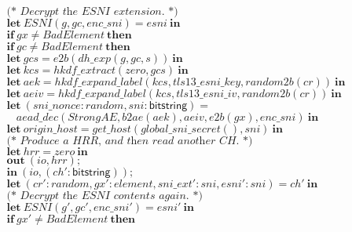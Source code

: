 \documentclass{article}
\newcommand{\kwl}[1]{\mathbf{#1}}
\newcommand{\kwt}[1]{\mathsf{#1}}
\newcommand{\var}[1]{\mathit{#1}}
\theoremstyle{definition}
\begin{document}
\begin{tabbing}
$ $\\
$\ \ \ \ \ \textit{(* Decrypt the ESNI extension. *)} $\\
$\ \ \ \ \ \kwl{let}\ \var{ESNI}(\var{g}, \var{gc}, \var{enc{\_}sni}) = \var{esni}\ \kwl{in} $\\
$\ \ \ \ \ \kwl{if}\ \var{gx}\neq\var{BadElement}\ \kwl{then} $\\
$\ \ \ \ \ \kwl{if}\ \var{gc}\neq\var{BadElement}\ \kwl{then} $\\
$\ \ \ \ \ \kwl{let}\ \var{gcs} = \var{e2b}(\var{dh{\_}exp}(\var{g}, \var{gc}, \var{s}))\ \kwl{in} $\\
$\ \ \ \ \ \kwl{let}\ \var{kcs} = \var{hkdf{\_}extract}(\var{zero}, \var{gcs})\ \kwl{in} $\\
$\ \ \ \ \ \kwl{let}\ \var{aek} = \var{hkdf{\_}expand{\_}label}(\var{kcs}, \var{tls13{\_}esni{\_}key}, \var{random2b}(\var{cr}))\ \kwl{in} $\\
$\ \ \ \ \ \kwl{let}\ \var{aeiv} = \var{hkdf{\_}expand{\_}label}(\var{kcs}, \var{tls13{\_}esni{\_}iv}, \var{random2b}(\var{cr}))\ \kwl{in} $\\
$\ \ \ \ \ \kwl{let}\ (\var{sni{\_}nonce}{:}\var{random}, \var{sni}{:}\kwt{bitstring}) =  $\\
$\ \ \ \ \ \ \ \ \ \var{aead{\_}dec}(\var{StrongAE}, \var{b2ae}(\var{aek}), \var{aeiv}, \var{e2b}(\var{gx}), \var{enc{\_}sni})\ \kwl{in} $\\
$ $\\
$\ \ \ \ \ \kwl{let}\ \var{origin{\_}host} = \var{get{\_}host}(\var{global{\_}sni{\_}secret}(), \var{sni})\ \kwl{in} $\\
$ $\\
$\ \ \ \ \ \textit{(* Produce a HRR, and then read another CH. *)} $\\
$\ \ \ \ \ \kwl{let}\ \var{hrr} = \var{zero}\ \kwl{in} $\\
$\ \ \ \ \ \kwl{out}\ (\var{io}, \var{hrr}); $\\
$\ \ \ \ \ \kwl{in}\ (\var{io}, (\var{ch'}{:}\kwt{bitstring})); $\\
$\ \ \ \ \ \kwl{let}\ (\var{cr'}{:}\var{random}, \var{gx'}{:}\var{element}, \var{sni{\_}ext'}{:}\var{sni}, \var{esni'}{:}\var{sni}) = \var{ch'}\ \kwl{in} $\\
$ $\\
$\ \ \ \ \ \textit{(* Decrypt the ESNI contents again. *)} $\\
$\ \ \ \ \ \kwl{let}\ \var{ESNI}(\var{g'}, \var{gc'}, \var{enc{\_}sni'}) = \var{esni'}\ \kwl{in} $\\
$\ \ \ \ \ \kwl{if}\ \var{gx'}\neq\var{BadElement}\ \kwl{then} $\\

\end{tabbing}
\end{document}
